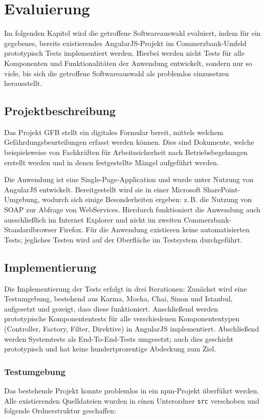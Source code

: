 \section{Evaluierung}
Im folgenden Kapitel wird die getroffene Softwareauswahl evaluiert, indem für ein gegebenes, bereits existierendes AngularJS-Projekt im Commerzbank-Umfeld prototypisch Tests implementiert werden. Hierbei werden nicht Tests für alle Komponenten und Funktionalitäten der Anwendung entwickelt, sondern nur so viele, bis sich die getroffene Softwareauswahl als problemlos einzusetzen herausstellt.

\subsection{Projektbeschreibung}
Das Projekt GFB stellt ein digitales Formular bereit, mittels welchem Gefährdungsbeurteilungen erfasst werden können. Dies sind Dokumente, welche beispielsweise von Fachkräften für Arbeitssicherheit nach Betriebsbegehungen erstellt werden und in denen festgestellte Mängel aufgeführt werden.\cite{gfb}

Die Anwendung ist eine Single-Page-Application und wurde unter Nutzung von AngularJS entwickelt. Bereitgestellt wird sie in einer Microsoft SharePoint-Umgebung, wodurch sich einige Besonderheiten ergeben: z.\,B. die Nutzung von SOAP zur Abfrage von WebServices. Hierdurch funktioniert die Anwendung auch ausschließlich im Internet Explorer und nicht im zweiten Commerzbank-Standardbrowser Firefox. Für die Anwendung existieren keine automatisierten Tests; jegliches Testen wird auf der Oberfläche im Testsystem durchgeführt.\cite{gfb}

\subsection{Implementierung}
Die Implementierung der Tests erfolgt in drei Iterationen: Zunächst wird eine Testumgebung, bestehend aus Karma, Mocha, Chai, Sinon und Istanbul, aufgesetzt und gezeigt, dass diese funktioniert. Anschließend werden prototypische Komponententests für alle verschiedenen Komponententypen (Controller, Factory, Filter, Direktive) in AngularJS implementiert. Abschließend werden Systemtests als End-To-End-Tests umgesetzt; auch dies geschieht prototypisch und hat keine hundertprozentige Abdeckung zum Ziel.

\subsubsection{Testumgebung}
Das bestehende Projekt konnte problemlos in ein npm-Projekt überführt werden. Alle existierenden Quelldateien wurden in einen Unterordner \texttt{src} verschoben und folgende Ordnerstruktur geschaffen:
\begin{figure}[H]
\end{figure}

